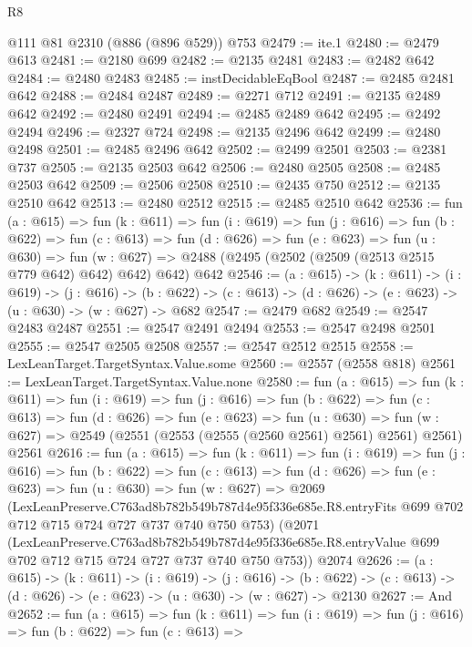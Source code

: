 \begin{lexlean}{R8}
\begin{coremodule}
    @111
    @81
    @2310
    (@886 (@896 @529))
    @753
@2479 := ite.{1}
@2480 := @2479 @613
@2481 := @2180 @699
@2482 := @2135 @2481
@2483 := @2482 @642
@2484 := @2480 @2483
@2485 := instDecidableEqBool
@2487 := @2485 @2481 @642
@2488 := @2484 @2487
@2489 := @2271 @712
@2491 := @2135 @2489 @642
@2492 := @2480 @2491
@2494 := @2485 @2489 @642
@2495 := @2492 @2494
@2496 := @2327 @724
@2498 := @2135 @2496 @642
@2499 := @2480 @2498
@2501 := @2485 @2496 @642
@2502 := @2499 @2501
@2503 := @2381 @737
@2505 := @2135 @2503 @642
@2506 := @2480 @2505
@2508 := @2485 @2503 @642
@2509 := @2506 @2508
@2510 := @2435 @750
@2512 := @2135 @2510 @642
@2513 := @2480 @2512
@2515 := @2485 @2510 @642
@2536 := fun (a : @615) =>
  fun (k : @611) =>
  fun (i : @619) =>
  fun (j : @616) =>
  fun (b : @622) =>
  fun (c : @613) =>
  fun (d : @626) =>
  fun (e : @623) =>
  fun (u : @630) =>
  fun (w : @627) => @2488 (@2495 (@2502 (@2509 (@2513 @2515 @779 @642) @642) @642) @642) @642
@2546 := (a : @615) ->
  (k : @611) ->
  (i : @619) ->
  (j : @616) ->
  (b : @622) -> (c : @613) -> (d : @626) -> (e : @623) -> (u : @630) -> (w : @627) -> @682
@2547 := @2479 @682
@2549 := @2547 @2483 @2487
@2551 := @2547 @2491 @2494
@2553 := @2547 @2498 @2501
@2555 := @2547 @2505 @2508
@2557 := @2547 @2512 @2515
@2558 := LexLeanTarget.TargetSyntax.Value.some
@2560 := @2557 (@2558 @818)
@2561 := LexLeanTarget.TargetSyntax.Value.none
@2580 := fun (a : @615) =>
  fun (k : @611) =>
  fun (i : @619) =>
  fun (j : @616) =>
  fun (b : @622) =>
  fun (c : @613) =>
  fun (d : @626) =>
  fun (e : @623) =>
  fun (u : @630) =>
  fun (w : @627) => @2549 (@2551 (@2553 (@2555 (@2560 @2561) @2561) @2561) @2561) @2561
@2616 := fun (a : @615) =>
  fun (k : @611) =>
  fun (i : @619) =>
  fun (j : @616) =>
  fun (b : @622) =>
  fun (c : @613) =>
  fun (d : @626) =>
  fun (e : @623) =>
  fun (u : @630) =>
  fun (w : @627) =>
  @2069
    (LexLeanPreserve.C763ad8b782b549b787d4e95f336e685e.R8.entryFits
      @699
      @702
      @712
      @715
      @724
      @727
      @737
      @740
      @750
      @753)
    (@2071
      (LexLeanPreserve.C763ad8b782b549b787d4e95f336e685e.R8.entryValue
        @699
        @702
        @712
        @715
        @724
        @727
        @737
        @740
        @750
        @753))
    @2074
@2626 := (a : @615) ->
  (k : @611) ->
  (i : @619) ->
  (j : @616) ->
  (b : @622) -> (c : @613) -> (d : @626) -> (e : @623) -> (u : @630) -> (w : @627) -> @2130
@2627 := And
@2652 := fun (a : @615) =>
  fun (k : @611) =>
  fun (i : @619) =>
  fun (j : @616) =>
  fun (b : @622) =>
  fun (c : @613) =>

\end{coremodule}
\end{lexlean}
